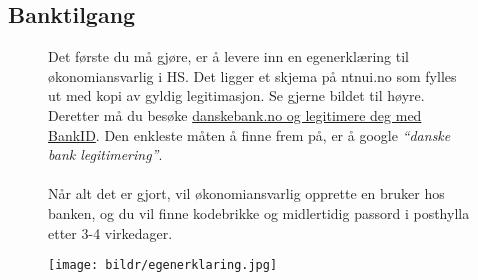 \subsection*{Banktilgang}
\begin{figure}[!htb]
\centering
\begin{minipage}{0.4\textwidth}
	Det første du må gjøre, er å levere inn en egenerklæring til økonomiansvarlig i HS. Det ligger et skjema på ntnui.no som fylles ut med kopi av gyldig legitimasjon. Se gjerne bildet til høyre. \\
	Deretter må du besøke \href{https://www.danskebank.no/nb-no/bedrift/smaabedrifter/nettbank/pages/identifisering.aspx}{danskebank.no og legitimere deg med BankID}. Den enkleste måten å finne frem på, er å google \emph{``danske bank legitimering''}. \\ \\
Når alt det er gjort, vil økonomiansvarlig opprette en bruker hos banken, og du vil finne kodebrikke og midlertidig passord i posthylla etter 3-4 virkedager.
\end{minipage}
\begin{minipage}{0.5\textwidth}
	\texttt{[image: bildr/egenerklaring.jpg]}
\end{minipage}
\end{figure}
